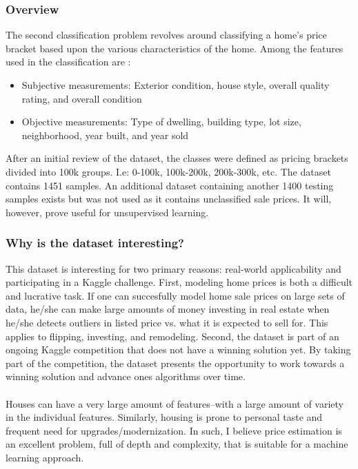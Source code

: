 \documentclass[h]{article}
\begin{document}
\subsubsection*{Overview}
The second classification problem revolves around classifying a home's price 
bracket based upon the various characteristics of the home.  Among the features 
used in the classification are :
\begin{itemize}
  \item Subjective measurements: Exterior condition, house style, overall quality rating, and overall condition
  \item Objective measurements: Type of dwelling, building type, lot size, neighborhood, year built, and year sold
\end{itemize}
After an initial review of the dataset, the classes were defined as pricing 
brackets divided into 100k groups.  I.e: 0-100k, 100k-200k, 200k-300k, etc.  The 
dataset contains 1451 samples.  An additional dataset containing another 1400 
testing samples exists but was not used as it contains unclassified sale 
prices.  It will, however, prove useful for unsupervised learning. \subsubsection*{Why is the dataset interesting?}
This dataset is interesting for two primary reasons: real-world applicability 
and participating in a Kaggle challenge.  First, modeling home prices is both a 
difficult and lucrative task.  If one can succesfully model home sale prices on 
large sets of data, he/she can make large amounts of money investing in real 
estate when he/she detects outliers in listed price vs. what it is expected to sell for.  
This applies to flipping, investing, and remodeling.  Second, the dataset is 
part of an ongoing Kaggle competition that does not have a winning solution yet. 
 By taking part of the competition, the dataset presents the opportunity to work 
 towards a winning solution and advance ones algorithms over time. 
 \\ \\
 Houses can have a very large amount of features--with a large amount of variety 
 in the individual features.  Similarly, housing is prone to personal taste and 
 frequent need for upgrades/modernization.  In such, I believe price estimation is an 
 excellent problem, full of depth and complexity, that is suitable for a machine 
 learning approach.
 
\end{document}
